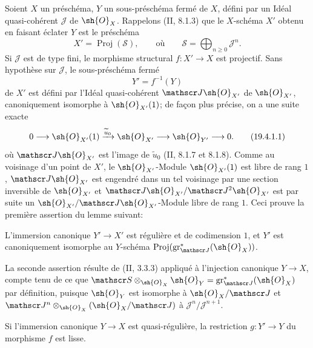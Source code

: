 \begin{env}[19.4.1]
\label{IV.19.4.1}
Soient $X$ un préschéma, $Y$ un sous-préschéma fermé de $X$, défini par un Idéal quasi-cohérent $\mathscr J$ de $\sh{O}_X$. Rappelons (II, 8.1.3) que le $X$-schéma $X'$ obtenu en faisant éclater $Y$ est le préschéma
\[
  X'=\operatorname{Proj}(\mathscr S),\qquad\text{où}\qquad \mathscr S=\bigoplus_{n\geq0}\mathscr J^n.
\]
Si $\mathscr J$ est de type fini, le morphisme structural $f:X'\to X$ est projectif. Sans hypothèse sur $\mathscr J$, le sous-préschéma fermé
\[
  Y'=f^{-1}(Y)
\]
de $X'$ est défini par l'Idéal quasi-cohérent $\mathscr J\sh{O}_{X'}$ de $\sh{O}_{X'}$, canoniquement isomorphe à $\sh{O}_{X'}(1)$; de façon plus précise, on a une suite exacte
\begin{equation}
  0\longrightarrow\sh{O}_{X'}(1)\xrightarrow{\widetilde u_0}\sh{O}_{X'}\longrightarrow\sh{O}_{Y'}\longrightarrow0.
  \tag{19.4.1.1}\label{IV.19.4.1.1}
\end{equation}
où $\mathscr J\sh{O}_{X'}$ est l'image de $\widetilde u_0$ (II, 8.1.7 et 8.1.8). Comme au voisinage d'un point de $X'$, le $\sh{O}_{X'}$-Module $\sh{O}_{X'}(1)$ est libre de rang $1$, $\mathscr J\sh{O}_{X'}$ est engendré dans un tel voisinage par une section inversible de $\sh{O}_{X'}$ et $\mathscr J\sh{O}_{X'}/\mathscr J^2\sh{O}_{X'}$ est par suite un $\sh{O}_{X'}/\mathscr J\sh{O}_{X'}$-Module libre de rang $1$. Ceci prouve la première assertion du lemme suivant:
\end{env}

\begin{lemma}[19.4.2]
\label{IV.19.4.2}
L'immersion canonique $Y'\to X'$ est régulière et de codimension $1$, et $Y'$ est canoniquement isomorphe au $Y$-schéma $\operatorname{Proj}(\operatorname{gr}_{\mathscr J}^*(\sh{O}_X))$.
\end{lemma}

La seconde assertion résulte de (II, 3.3.3) appliqué à l'injection canonique $Y\to X$, compte tenu de ce que $\mathscr S\otimes_{\sh{O}_X}\sh{O}_Y=\operatorname{gr}_{\mathscr J}^*(\sh{O}_X)$ par définition, puisque $\sh{O}_Y$ est isomorphe à $\sh{O}_X/\mathscr J$ et $\mathscr J^n\otimes_{\sh{O}_X}(\sh{O}_X/\mathscr J)$ à $\mathscr J^n/\mathscr J^{n+1}$.

\begin{corollary}[19.4.3]
\label{IV.19.4.3}
Si l'immersion canonique $Y\to X$ est quasi-régulière, la restriction $g:Y'\to Y$ du morphisme $f$ est lisse.
\end{corollary}


